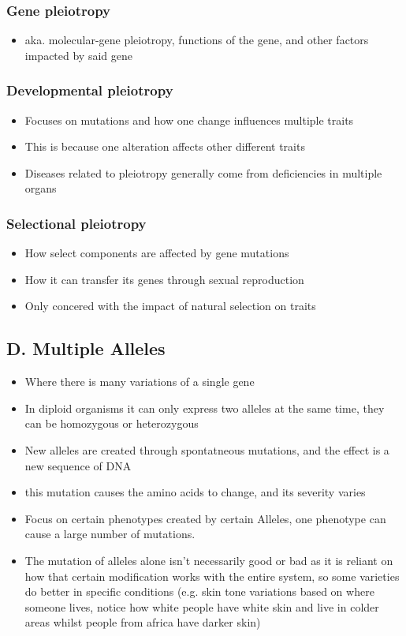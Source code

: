 \documentclass{article}
\begin{document}
\subsubsection*{Gene pleiotropy}
\begin{itemize}
    \item aka. molecular-gene pleiotropy, functions of the gene, and other factors impacted by said gene
\end{itemize}

\subsubsection*{Developmental pleiotropy}
\begin{itemize}
    \item Focuses on mutations and how one change influences multiple traits
    \item This is because one alteration affects other different traits
    \item Diseases related to pleiotropy generally come from deficiencies in multiple organs
\end{itemize}

\subsubsection*{Selectional pleiotropy}
\begin{itemize}
    \item How select components are affected by gene mutations
    \item How it can transfer its genes through sexual reproduction
    \item Only concered with the impact of natural selection on traits
\end{itemize}
\subsection*{D. Multiple Alleles}
\begin{itemize}
    \item Where there is many variations of a single gene
    \item In diploid organisms it can only express two alleles at the same time, they can be homozygous or heterozygous
    \item New alleles are created through spontatneous mutations, and the effect is a new sequence of DNA
    \item this mutation causes the amino acids to change, and its severity varies
    \item Focus on certain phenotypes created by certain Alleles, one phenotype can cause a large number of mutations.
    \item The mutation of alleles alone isn't necessarily good or bad as it is reliant on how that certain modification works with the entire system, so some varieties do better in specific conditions (e.g. skin tone variations based on where someone lives, notice how white people have white skin and live in colder areas whilst people from africa have darker skin)
\end{itemize}
\end{document}
